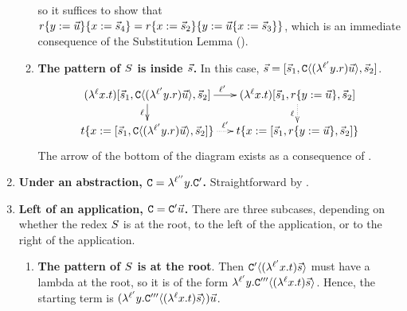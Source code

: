 \begin{enumerate}
\begin{enumerate}
    so it suffices to show that
    $r\{y := \vec{u}\}\{x := \vec{s}_4\}
      =
      r\{x := \vec{s}_2\}\{y := \vec{u}\{x := \vec{s}_3\}\}
    $, which is an immediate consequence of the Substitution Lemma ().
  \item {\bf The pattern of $S$ is inside $\vec{s}$.}
    \label{strong_permutation__case_redextwo_inside_tmtwo}
    In this case, $\vec{s} = [\vec{s}_1, \mathtt{C}\langle(\lambda^{\ell'} y. r) \vec{u}\rangle, \vec{s}_2]$.
    \[
    \xymatrix@C=.5cm@R=.5cm{
     (\lamp{\lab}{\var}{\tm}) [\ls{\tmtwo}_1,
                               \conof{(\lamp{\lab'}{\vartwo}{\tmfour}) \ls{\tmthree}},
                               \ls{\tmtwo}_2]
                        \ar[d]_-{\lab}
                        \ar[r]^{\lab'} &
     (\lamp{\lab}{\var}{\tm}) [\ls{\tmtwo}_1,
                               \subs{\tmfour}{\vartwo}{\ls{\tmthree}},
                               \ls{\tmtwo}_2]
                        \ar@{.>}[d]_-{\lab} \\
     \subs{\tm}{\var}{[\ls{\tmtwo}_1,
                       \conof{(\lamp{\lab'}{\vartwo}{\tmfour}) \ls{\tmthree}},
                       \ls{\tmtwo}_2]}
                       \ar@{.>}[r]^-{\lab'}
                       &
      \subs{\tm}{\var}{[\ls{\tmtwo}_1,
                        \subs{\tmfour}{\vartwo}{\ls{\tmthree}},\ls{\tmtwo}_2]}        \\
    }
    \]
    The arrow of the bottom of the diagram exists as a consequence of .
  \end{enumerate}
\item {\bf Under an abstraction, $\mathtt{C} = \lambda^{\ell''} y. \mathtt{C}'$.}
  Straightforward by \ih.
\item {\bf Left of an application, $\mathtt{C} = \mathtt{C}'\vec{u}$.}
    There are three subcases, depending on whether the redex $S$ is
    at the root, to the left of the application, or to the right of the application.
    \begin{enumerate}
    \item {\bf The pattern of $S$ is at the root}.
      Then $\mathtt{C}'\langle(\lambda^{\ell'} x. t)\vec{s}\rangle$ must have a lambda at the root,
      so it is of the form $\lambda^{\ell'} y. \mathtt{C}'''\langle(\lambda^{\ell} x. t) \vec{s}\rangle$.
      Hence, the starting term is
      $(\lambda^{\ell'} y. \mathtt{C}'''\langle(\lambda^{\ell} x. t) \vec{s}\rangle) \vec{u}$.

\end{enumerate}
\end{enumerate}
